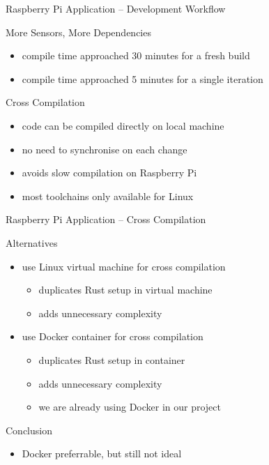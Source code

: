 \begin{frame}{Raspberry Pi Application -- Development Workflow}
  \begin{block}{More Sensors, More Dependencies}
    \begin{itemize}
      \item compile time approached 30 minutes for a fresh build
      \item compile time approached 5 minutes for a single iteration
    \end{itemize}
  \end{block}

  \begin{block}{ Cross Compilation}
    \begin{itemize}
      \item code can be compiled directly on local machine
      \item no need to synchronise on each change
      \item avoids slow compilation on Raspberry Pi
    \end{itemize}
  \end{block}

  \begin{block}{}
    \begin{itemize}
      \item most toolchains only available for Linux
    \end{itemize}
  \end{block}
\end{frame}

\begin{frame}{Raspberry Pi Application -- Cross Compilation}
  \begin{block}{Alternatives}
    \begin{itemize}
      \item use Linux virtual machine for cross compilation
      \begin{itemize}
        \item {} duplicates Rust setup in virtual machine
        \item {} adds unnecessary complexity
      \end{itemize}
      \item use Docker container for cross compilation
      \begin{itemize}
        \item {} duplicates Rust setup in container
        \item {} adds unnecessary complexity
        \item {} we are already using Docker in our project
      \end{itemize}
    \end{itemize}
  \end{block}

  \begin{block}{Conclusion}
    \begin{itemize}
      \item Docker preferrable, but still not ideal
    \end{itemize}
  \end{block}
\end{frame}

